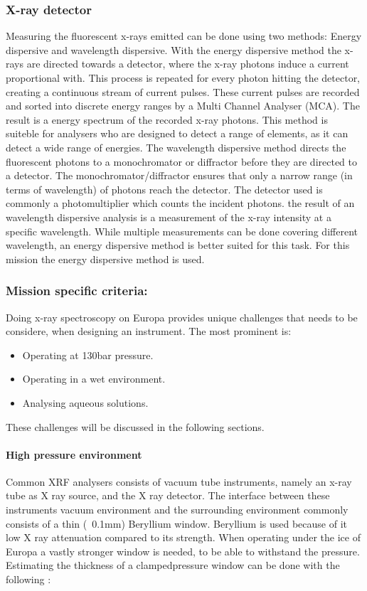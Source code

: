 \subsubsection{X-ray detector}
Measuring the fluorescent x-rays emitted can be done using two methods: Energy dispersive and wavelength dispersive. 
With the energy dispersive method the x-rays are directed towards a detector, where the x-ray photons induce a current proportional with. This process is repeated for every photon hitting the detector, creating a continuous stream of current pulses. These current pulses are recorded and sorted into discrete energy ranges by a Multi Channel Analyser (MCA). The result is a energy spectrum of the recorded x-ray photons. This method is suiteble for analysers who are designed to detect a range of elements, as it can detect a wide range of energies.
The wavelength dispersive method directs the fluorescent photons to a monochromator or diffractor before they are directed to a detector. The monochromator/diffractor ensures that only a narrow range (in terms of wavelength) of photons reach the detector. The detector used is commonly a photomultiplier which counts the incident photons. the result of an wavelength dispersive analysis is a measurement of the x-ray intensity at a specific wavelength. While multiple measurements can be done covering different wavelength, an energy dispersive method is better suited for this task.
For this mission the energy dispersive method is used.

\subsubsection{Mission specific criteria:}
Doing x-ray spectroscopy on Europa provides unique challenges that needs to be considere, when designing an instrument. The most prominent is:\\
\begin{itemize}
\item Operating at 130bar pressure.
\item Operating in a wet environment.
\item Analysing aqueous solutions.
\end{itemize}
These challenges will be discussed in the following sections.

\paragraph{High pressure environment}
Common XRF analysers consists of vacuum tube instruments, namely an  x-ray tube as X ray source, and the X ray detector. The interface between these instruments vacuum environment and the surrounding environment commonly consists of a thin (~0.1mm) Beryllium window. Beryllium is used because of it low X ray attenuation compared to its strength. When operating under the ice of Europa a vastly stronger window is needed, to be able to withstand the pressure.
Estimating the thickness of a clampedpressure window can be done with the following \citep{High_pressure_window}: 


